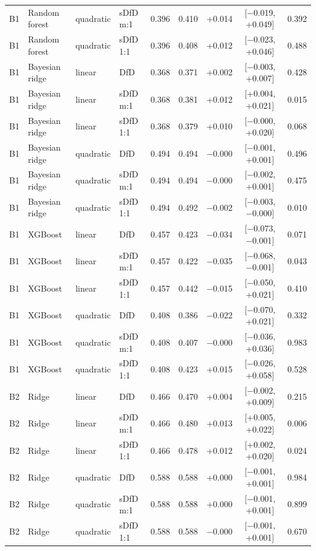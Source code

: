 \begin{longtable}{llllccccc}
B1 & Random forest & quadratic & sDfD m:1 & 0.396 & 0.410 & +0.014 & [$-$0.019, +0.049] & 0.392 \\
B1 & Random forest & quadratic & sDfD 1:1 & 0.396 & 0.408 & +0.012 & [$-$0.023, +0.046] & 0.488 \\
B1 & Bayesian ridge & linear & DfD & 0.368 & 0.371 & +0.002 & [$-$0.003, +0.007] & 0.428 \\
B1 & Bayesian ridge & linear & sDfD m:1 & 0.368 & 0.381 & +0.012 & [+0.004, +0.021] & 0.015 \\
B1 & Bayesian ridge & linear & sDfD 1:1 & 0.368 & 0.379 & +0.010 & [$-$0.000, +0.020] & 0.068 \\
B1 & Bayesian ridge & quadratic & DfD & 0.494 & 0.494 & $-$0.000 & [$-$0.001, +0.001] & 0.496 \\
B1 & Bayesian ridge & quadratic & sDfD m:1 & 0.494 & 0.494 & $-$0.000 & [$-$0.002, +0.001] & 0.475 \\
B1 & Bayesian ridge & quadratic & sDfD 1:1 & 0.494 & 0.492 & $-$0.002 & [$-$0.003, $-$0.000] & 0.010 \\
B1 & XGBoost & linear & DfD & 0.457 & 0.423 & $-$0.034 & [$-$0.073, $-$0.001] & 0.071 \\
B1 & XGBoost & linear & sDfD m:1 & 0.457 & 0.422 & $-$0.035 & [$-$0.068, $-$0.001] & 0.043 \\
B1 & XGBoost & linear & sDfD 1:1 & 0.457 & 0.442 & $-$0.015 & [$-$0.050, +0.021] & 0.410 \\
B1 & XGBoost & quadratic & DfD & 0.408 & 0.386 & $-$0.022 & [$-$0.070, +0.021] & 0.332 \\
B1 & XGBoost & quadratic & sDfD m:1 & 0.408 & 0.407 & $-$0.000 & [$-$0.036, +0.036] & 0.983 \\
B1 & XGBoost & quadratic & sDfD 1:1 & 0.408 & 0.423 & +0.015 & [$-$0.026, +0.058] & 0.528 \\
B2 & Ridge & linear & DfD & 0.466 & 0.470 & +0.004 & [$-$0.002, +0.009] & 0.215 \\
B2 & Ridge & linear & sDfD m:1 & 0.466 & 0.480 & +0.013 & [+0.005, +0.022] & 0.006 \\
B2 & Ridge & linear & sDfD 1:1 & 0.466 & 0.478 & +0.012 & [+0.002, +0.020] & 0.024 \\
B2 & Ridge & quadratic & DfD & 0.588 & 0.588 & +0.000 & [$-$0.001, +0.001] & 0.984 \\
B2 & Ridge & quadratic & sDfD m:1 & 0.588 & 0.588 & +0.000 & [$-$0.001, +0.001] & 0.899 \\
B2 & Ridge & quadratic & sDfD 1:1 & 0.588 & 0.588 & $-$0.000 & [$-$0.001, +0.001] & 0.670 \\

\end{longtable}
